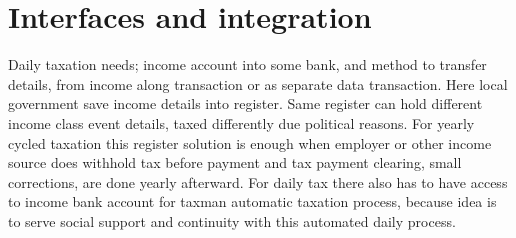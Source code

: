 \section{Interfaces and integration}
\label{interfaces_and_integration}
Daily taxation needs; income account into some bank, and method to transfer details,
from income along transaction or as separate data transaction.
Here local government save income details into register.
Same register can hold different income class event details,
taxed differently due political reasons.
For yearly cycled taxation this register solution is enough
when employer or other income source does withhold tax before payment
and tax payment clearing, small corrections, are done yearly afterward.
For daily tax there also has to have access to income bank account
for taxman automatic taxation process,
because idea is to serve social support and continuity
with this automated daily process.

